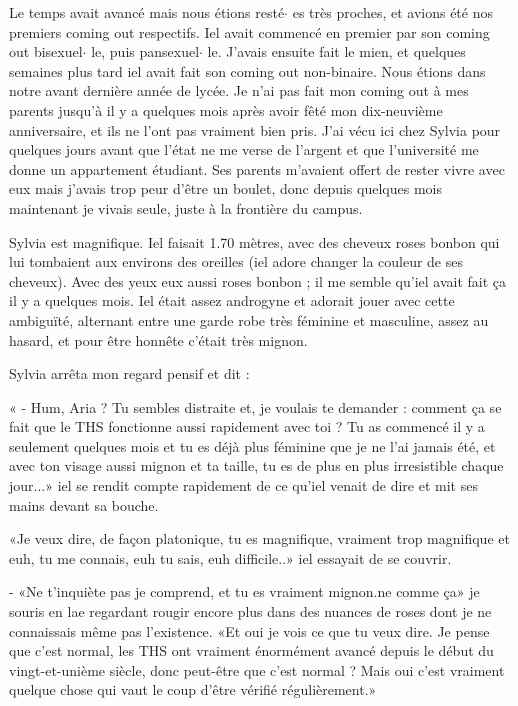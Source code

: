 \documentclass[12pt,hidelinks,a4paper]{book}
\begin{document}
Le temps avait avancé mais nous étions resté$\cdot$ es très proches, et avions
été nos premiers coming out respectifs. Iel avait commencé en premier
par son coming out bisexuel$\cdot$ le, puis pansexuel$\cdot$ le. J'avais ensuite
fait le mien, et quelques semaines plus tard iel avait fait son coming
out non-binaire. Nous étions dans notre avant dernière année de lycée.
Je n'ai pas fait mon coming out à mes parents jusqu'à il y a quelques
mois après avoir fêté mon dix-neuvième anniversaire, et ils ne l'ont
pas vraiment bien pris. J'ai vécu ici chez Sylvia pour quelques jours
avant que l'état ne me verse de l'argent et que l'université me donne
un appartement étudiant. Ses parents m'avaient offert de rester vivre
avec eux mais j'avais trop peur d'être un boulet, donc depuis quelques
mois maintenant je vivais seule, juste à la frontière du campus.

\bigskip

Sylvia est magnifique. Iel faisait 1.70 mètres, avec des cheveux roses
bonbon qui lui tombaient aux environs des oreilles (iel adore changer
la couleur de ses cheveux). Avec des yeux eux aussi roses bonbon ;
il me semble qu'iel avait fait ça il y a quelques mois. Iel était
assez androgyne et adorait jouer avec cette ambiguïté, alternant entre
une garde robe très féminine et masculine, assez au hasard, et pour
être honnête c'était très mignon.

\bigskip

Sylvia arrêta mon regard pensif et dit :

« - Hum, Aria ? Tu sembles distraite et, je voulais te demander :
comment ça se fait que le THS fonctionne aussi rapidement avec toi
? Tu as commencé il y a seulement quelques mois et tu es déjà plus
féminine que je ne l'ai jamais été, et avec ton visage aussi mignon
et ta taille, tu es de plus en plus irresistible chaque jour...»
iel se rendit compte rapidement de ce qu'iel venait de dire et mit
ses mains devant sa bouche.

\bigskip
«Je veux dire, de façon platonique, tu es magnifique, vraiment trop
magnifique et euh, tu me connais, euh tu sais, euh difficile..»
iel essayait de se couvrir.

\bigskip

- «Ne t'inquiète pas je comprend, et tu es vraiment mignon.ne comme
ça» je souris en lae regardant rougir encore plus dans des nuances
de roses dont je ne connaissais même pas l'existence. «Et oui je
vois ce que tu veux dire. Je pense que c'est normal, les THS ont vraiment
énormément avancé depuis le début du vingt-et-unième siècle, donc
peut-être que c'est normal ? Mais oui c'est vraiment quelque chose
qui vaut le coup d'être vérifié régulièrement.»
\end{document}

